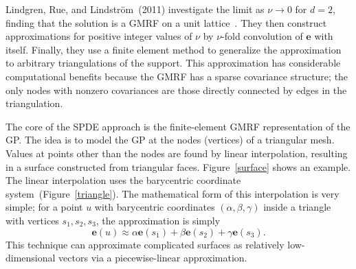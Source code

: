 \documentclass[]{interact}
\begin{document}
Lindgren, Rue, and Lindstr\"{o}m~(2011) investigate the limit as \(\nu \to 0\) for
\(d = 2\), finding that the solution is a GMRF on a unit
lattice~\cite{lindgrenetal}. They then construct approximations for positive
integer values of \(\nu\) by \(\nu\)-fold convolution of \(\mathbf{e}\)
with itself. Finally, they use a finite element method to generalize the
approximation to arbitrary triangulations of the support. This approximation
has considerable computational benefits because the GMRF has a sparse
covariance structure; the only nodes with nonzero covariances are those
directly connected by edges in the triangulation.

The core of the SPDE approach is the finite-element GMRF representation of the
GP. The idea is to model the GP at the nodes (vertices) of a triangular mesh.
Values at points other than the nodes are found by linear interpolation,
resulting in a surface constructed from triangular faces. Figure~\ref{surface}
shows an example. The linear interpolation uses the barycentric coordinate
system~(Figure~\ref{triangle}). The mathematical form of this interpolation is
very simple; for a point \(u\) with barycentric coordinates \((\alpha, \beta,
\gamma)\) inside a triangle with vertices \(s_{1}, s_{2}, s_{3}\), the
approximation is simply
\begin{displaymath}
\mathbf{e}(u) \approx \alpha \mathbf{e}(s_{1})
+ \beta \mathbf{e}(s_{2}) + \gamma \mathbf{e}(s_{3}).
\end{displaymath}
This technique can approximate complicated surfaces as relatively
low-dimensional vectors via a piecewise-linear approximation.
\end{document}
